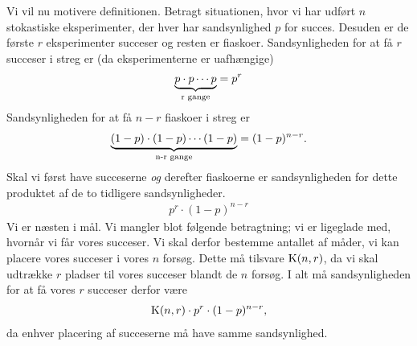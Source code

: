 Vi vil nu motivere definitionen. Betragt situationen, hvor vi har udført $n$ stokastiske eksperimenter, der hver har sandsynlighed $p$ for succes. Desuden er de første $r$ eksperimenter succeser og resten er fiaskoer. Sandsynligheden for at få $r$ succeser i streg er (da eksperimenterne er uafhængige)
\begin{align*}
	\underbrace{p\cdot p\cdots p}_{\textnormal{r gange}} = p^r
\end{align*}
Sandsynligheden for at få $n-r$ fiaskoer i streg er
\begin{align*}
	\underbrace{(1-p)\cdot (1-p)\cdots (1-p)}_{\textnormal{n-r gange}} = (1-p)^{n-r}.
\end{align*}
Skal vi først have succeserne \textit{og} derefter fiaskoerne er sandsynligheden for dette produktet af de to tidligere sandsynligheder.
\begin{align*}
	p^r \cdot (1-p)^{n-r}
\end{align*}
Vi er næsten i mål. Vi mangler blot følgende betragtning; vi er ligeglade med, hvornår vi får vores succeser. Vi skal derfor bestemme antallet af måder, vi kan placere vores succeser i vores $n$ forsøg. Dette må tilsvare $\textnormal{K}(n,r)$, da vi skal udtrække $r$ pladser til vores succeser blandt de $n$ forsøg. I alt må sandsynligheden for at få vores $r$ succeser derfor være
\begin{align*}
	\textnormal{K}(n,r) \cdot p^r \cdot (1-p)^{n-r},
\end{align*}
da enhver placering af succeserne må have samme sandsynlighed.

